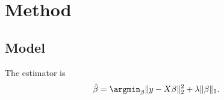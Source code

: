 \chapter{Method}
\section{Model}
\label{sec:setting}
The estimator is
\begin{equation}
  \hat{\beta} = \argmin_{\beta} \|y - X\beta\|_2^2 + \lambda \|\beta\|_1 .
\end{equation}
